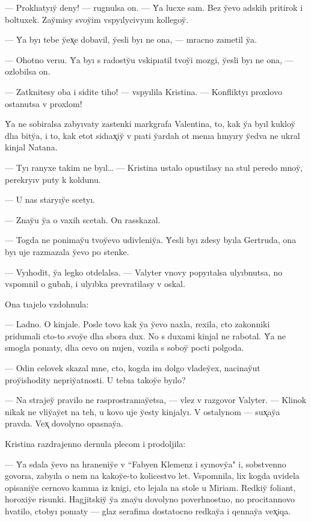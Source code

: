 \documentclass[10pt]{book}
\begin{document}
— Proklıatyıy̆ deny! — rugnulsa on. — Y̆a lucxe sam. Bez y̆evo adskih pritirok i boltuxek. Zay̆misy svoy̆im vspyılycivyım kollegoy̆.

— Y̆a byı tebe y̆ex̨e dobavil, y̆esli byı ne ona, — mracno zametil y̆a.

— Ohotno verıu. Y̆a byı s radosty̆u vskipıatil tvoy̆i mozgi, y̆esli byı ne ona, — ozlobilsa on.

— Zatknitesy oba i sidite tiho! — vspyılila Kristina. — Konfliktyı proxlovo ostanutsa v proxlom!

Y̆a ne sobiralsa zabyıvaty zastenki markgrafa Valentina, to, kak y̆a byıl kukloy̆ dlıa bity̆a, i to, kak etot sidıax̨iy̆ v pıati y̆ardah ot menıa hmyıry y̆edva ne ukral kinjal Natana.

— Tyı ranyxe takim ne byıl… — Kristina ustalo opustilasy na stul peredo mnoy̆, perekryıv puty k koldunu.

— U nas staryıy̆e scetyı.

— Znay̆u y̆a o vaxih scetah. On rasskazal.

— Togda ne ponimay̆u tvoy̆evo udivleniy̆a. Y̆esli byı zdesy byıla Gertruda, ona byı uje razmazala y̆evo po stenke.

— Vyıhodit, y̆a legko otdelalsa. — Valyter vnovy popyıtalsa ulyıbnutsa, no vspomnil o gubah, i ulyıbka prevratilasy v oskal.

Ona tıajelo vzdohnula:

— Ladno. O kinjale. Posle tovo kak y̆a y̆evo naxla, rexila, cto zakonniki pridumali cto-to svoy̆e dlıa sbora dux. No s duxami kinjal ne rabotal. Y̆a ne smogla ponıaty, dlıa cevo on nujen, vozila s soboy̆ pocti polgoda.

— Odin celovek skazal mne, cto, kogda im dolgo vladey̆ex, nacinay̆ut proy̆ishodity nepriy̆atnosti. U tebıa takoy̆e byılo?

— Na strajey̆ pravilo ne rasprostranıay̆etsa, — vlez v razgovor Valyter. — Klinok nikak ne vliy̆ay̆et na teh, u kovo uje y̆esty kinjalyı. V ostalynom — sux̨ay̆a pravda. Vex̨ dovolyno opasnay̆a.

Kristina razdrajenno dernula plecom i prodoljila:

— Y̆a sdala y̆evo na hraneniy̆e v ``Fabyen Klemenz i syınovy̆a" i, sobstvenno govorıa, zabyıla o nem na kakoy̆e-to kolicestvo let. Vspomnila, lix kogda uvidela opisaniy̆e cernovo kamnıa iz knigi, cto lejala na stole u Miriam. Redkiy̆ foliant, horoxiy̆e risunki. Hagjitskiy̆ y̆a znay̆u dovolyno poverhnostno, no procitannovo hvatilo, ctobyı ponıaty — glaz serafima dostatocno redkay̆a i qennay̆a vex̨iqa.
\end{document}
